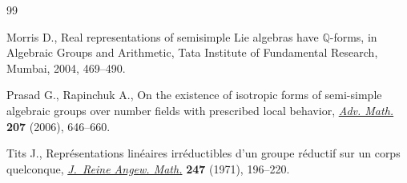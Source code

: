 %
\begin{thebibliography}{99}

Morris D., Real representations of semisimple {L}ie algebras have {${\mathbb
  Q}$}-forms, in Algebraic Groups and Arithmetic, Tata Institute of Fundamental
  Research, Mumbai, 2004, 469--490.


Prasad G., Rapinchuk A., On the existence of isotropic forms of semi-simple
  algebraic groups over number f\/ields with prescribed local behavior,
  \href{http://dx.doi.org/10.1016/j.aim.2006.01.001}{\textit{Adv. Math.}} \textbf{207} (2006), 646--660.


Tits J., Repr\'esentations lin\'eaires irr\'eductibles d'un groupe r\'eductif
  sur un corps quelconque, \href{http://dx.doi.org/10.1515/crll.1971.247.196}{\textit{J.~Reine Angew. Math.}} \textbf{247} (1971),
  196--220.



\end{thebibliography}

